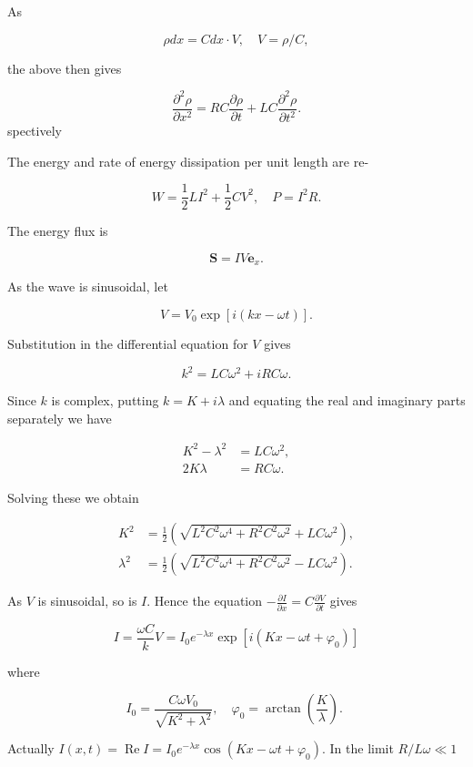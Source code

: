 \documentclass[10pt]{article}
\begin{document}
As

$$
\rho d x=C d x \cdot V, \quad V=\rho / C,
$$

the above then gives

$$
\frac{\partial^{2} \rho}{\partial x^{2}}=R C \frac{\partial \rho}{\partial t}+L C \frac{\partial^{2} \rho}{\partial t^{2}} .
$$
spectively

 The energy and rate of energy dissipation per unit length are re-

$$
W=\frac{1}{2} L I^{2}+\frac{1}{2} C V^{2}, \quad P=I^{2} R .
$$

The energy flux is

$$
\mathbf{S}=I V \mathbf{e}_{x} .
$$

 As the wave is sinusoidal, let

$$
V=V_{0} \exp [i(k x-\omega t)] .
$$

Substitution in the differential equation for $V$ gives

$$
k^{2}=L C \omega^{2}+i R C \omega .
$$

Since $k$ is complex, putting $k=K+i \lambda$ and equating the real and imaginary parts separately we have

$$
\begin{aligned}
K^{2}-\lambda^{2} &=L C \omega^{2}, \\
2 K \lambda &=R C \omega .
\end{aligned}
$$

Solving these we obtain

$$
\begin{aligned}
K^{2} &=\frac{1}{2}\left(\sqrt{L^{2} C^{2} \omega^{4}+R^{2} C^{2} \omega^{2}}+L C \omega^{2}\right), \\
\lambda^{2} &=\frac{1}{2}\left(\sqrt{L^{2} C^{2} \omega^{4}+R^{2} C^{2} \omega^{2}}-L C \omega^{2}\right) .
\end{aligned}
$$

As $V$ is sinusoidal, so is $I$. Hence the equation $-\frac{\partial I}{\partial x}=C \frac{\partial V}{\partial t}$ gives

$$
I=\frac{\omega C}{k} V=I_{0} e^{-\lambda x} \exp \left[i\left(K x-\omega t+\varphi_{0}\right)\right]
$$

where

$$
I_{0}=\frac{C \omega V_{0}}{\sqrt{K^{2}+\lambda^{2}}}, \quad \varphi_{0}=\arctan \left(\frac{K}{\lambda}\right) \text {. }
$$

Actually $I(x, t)=\operatorname{Re} I=I_{0} e^{-\lambda x} \cos \left(K x-\omega t+\varphi_{0}\right)$. In the limit $R / L \omega \ll 1$
\end{document}
